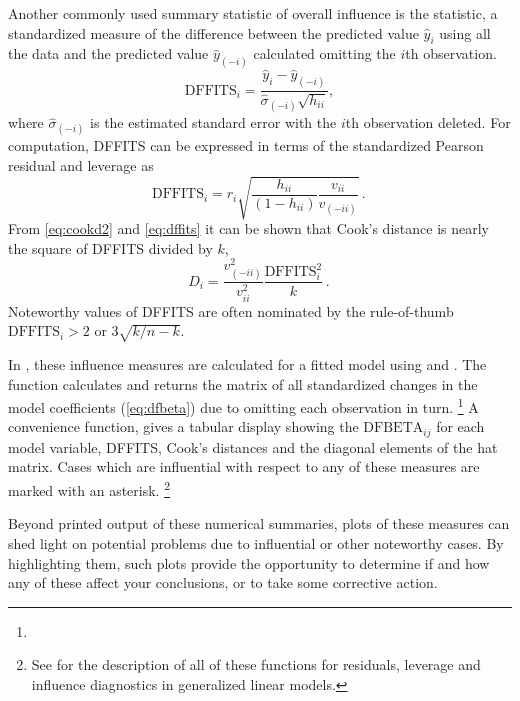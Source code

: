 \documentclass[11pt]{book}
\begin{document}
Another commonly used summary statistic of overall influence is
the  statistic, a standardized measure of the difference
between the predicted value $\hat{y}_i$ using all the data
and the predicted value $\hat{y}_{(-i)}$ calculated omitting
the $i$th observation.
\begin{equation*}
\mbox{DFFITS}_i = \frac{\hat{y}_i - \hat{y}_{(-i)}} {\hat{\sigma}_{(-i)} \sqrt{h_{ii}}}
\comma
\end{equation*}
where $\hat{\sigma}_{(-i)}$ is the estimated standard error with the $i$th observation
deleted.  For computation, DFFITS can be expressed in terms of the standardized
Pearson residual and leverage as
\begin{equation}\label{eq:dffits}
\mbox{DFFITS}_i = r_i  \sqrt{ \frac{h_{ii}} {(1-h_{ii})} \frac{v_{ii}} {v_{(-ii)}} }
\period
\end{equation}
From \eqref{eq:cookd2} and \eqref{eq:dffits} it can be shown that Cook's distance is
nearly the square of DFFITS divided by $k$,
\begin{equation}\label{eq:cook-dffits}
D_i = \frac{v_{(-ii)}^2}{v_{ii}^2} \frac{\mbox{DFFITS}_i^2}{k}
\period
\end{equation}
Noteworthy values of DFFITS are often nominated by the rule-of-thumb
$\mbox{DFFITS}_i > 2 \mbox{ or } 3 \sqrt{k / n-k}$.

In \R, these influence measures are calculated for a fitted 
model using  and .  
The  function calculates and returns the matrix of 
all standardized changes in the model coefficients (\eqref{eq:dfbeta})
due to omitting each observation in turn.%
\footnote{
}
A convenience
function,  gives a tabular display showing
the $\mbox{DFBETA}_{ij}$ for each model variable, DFFITS, Cook's distances and the diagonal elements of the hat matrix. 
Cases which are influential with respect to any of these measures are marked with an asterisk.%
\footnote{
See  for the description of all of these functions for residuals,
leverage and influence diagnostics in generalized linear models.
}

Beyond printed output of these numerical summaries, plots of these measures can shed light
on potential problems due to influential or other noteworthy cases. By highlighting them,
such plots provide the opportunity to determine if and how any of these affect your 
conclusions, or to take some corrective action.
\end{document}
